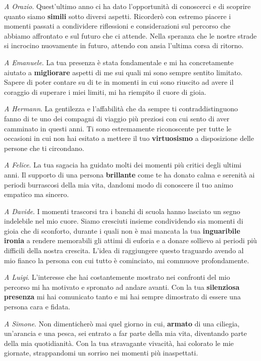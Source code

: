 \emph{A Orazio}. Quest'ultimo anno ci ha dato l'opportunità di conoscerci e di scoprire quanto siamo \textbf{simili} sotto diversi aspetti. Ricorderò con estremo piacere i momenti passati a condividere riflessioni e considerazioni sul percorso che abbiamo affrontato e sul futuro che ci attende. Nella speranza che le nostre strade si incrocino nuovamente in futuro, attendo con ansia l'ultima corsa di ritorno.

\emph{A Emanuele}. La tua presenza è stata fondamentale e mi ha concretamente aiutato a \textbf{migliorare} aspetti di me sui quali mi sono sempre sentito limitato. Sapere di poter contare su di te in momenti in cui sono riuscito ad avere il coraggio di superare i miei limiti, mi ha riempito il cuore di gioia.

\emph{A Hermann}. La gentilezza e l'affabilità che da sempre ti contraddistinguono fanno di te uno dei compagni di viaggio più preziosi con cui sento di aver camminato in questi anni. Ti sono estremamente riconoscente per tutte le occasioni in cui non hai esitato a mettere il tuo \textbf{virtuosismo} a disposizione delle persone che ti circondano.


\emph{A Felice}. La tua sagacia ha guidato molti dei momenti più critici degli ultimi anni. Il supporto di una persona \textbf{brillante} come te ha donato calma e serenità ai periodi burrascosi della mia vita, dandomi modo di conoscere il tuo animo empatico ma sincero. 

\emph{A Davide}. I momenti trascorsi tra i banchi di scuola hanno lasciato un segno indelebile nel mio cuore. Siamo cresciuti insieme condividendo sia momenti di gioia che di sconforto, durante i quali non è mai mancata la tua \textbf{inguaribile ironia} a rendere memorabili gli attimi di euforia e a donare sollievo ai periodi più difficili della nostra crescita. L'idea di raggiungere questo traguardo avendo al mio fianco la persona con cui tutto è cominciato, mi commuove profondamente. 

\emph{A Luigi}. L'interesse che hai costantemente mostrato nei confronti del mio percorso mi ha motivato e spronato ad andare avanti. Con la tua \textbf{silenziosa presenza} mi hai comunicato tanto e mi hai sempre dimostrato di essere una persona cara e fidata. 

\emph{A Simone}. Non dimenticherò mai quel giorno in cui, \textbf{armato} di una ciliegia, un'arancia e una pesca, sei entrato a far parte della mia vita, diventando parte della mia quotidianità. Con la tua stravagante vivacità, hai colorato le mie giornate, strappandomi un sorriso nei momenti più inaspettati. 

